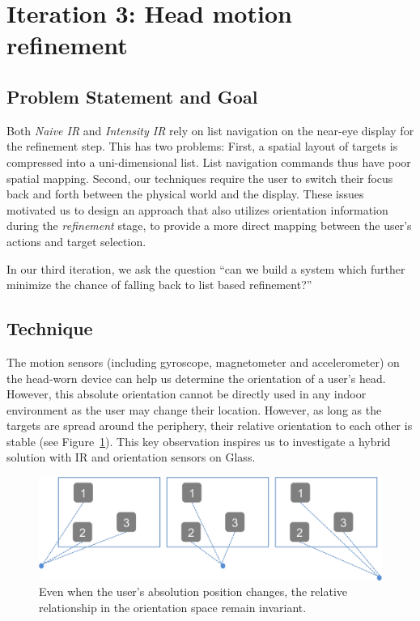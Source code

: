 \section{Iteration 3: Head motion refinement}
\label{sec:iteration-3:-head}
\subsection{Problem Statement and Goal}
Both {\em Naive IR} and {\em Intensity IR} rely on list navigation on the near-eye display for the refinement step. This has two problems: First, a spatial layout of targets is compressed into a uni-dimensional list. List navigation commands thus have poor spatial mapping. Second, our techniques require the user to switch their focus back and forth between the physical world and the display. These issues motivated us to design an approach that also utilizes orientation information during the {\em refinement} stage, to provide a more direct mapping between the user's actions and target selection.

In our third iteration, we ask the question ``can we build a system which further minimize the chance of falling back to list based refinement?''

\subsection{Technique}
The motion sensors (including gyroscope, magnetometer and accelerometer) on the head-worn device can help us determine the orientation of a user's head. However, this absolute orientation cannot be directly used in any indoor environment as the user may change their location. However, as long as the targets are spread around the periphery, their relative orientation to each other is stable (see Figure~\ref{fig:third_principle}). This key observation inspires us to investigate a hybrid solution with IR and orientation sensors on Glass.

\begin{figure}[t]
\centering
\includegraphics[width=1\columnwidth]{figures/third_principle.png}
\caption{Even when the user's absolution position changes, the relative relationship in the orientation space remain invariant.}
\label{fig:third_principle}
\end{figure}

